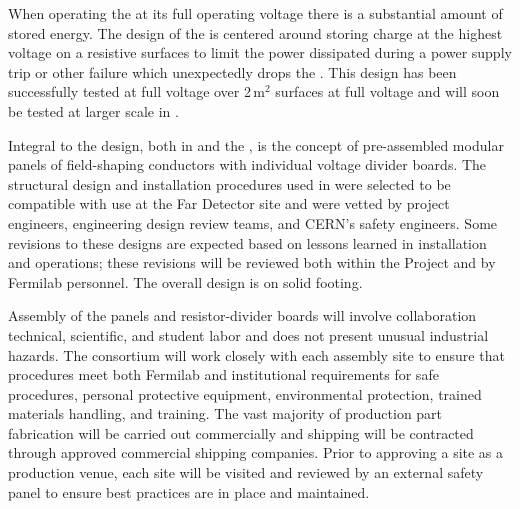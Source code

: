 When operating the  at its full operating voltage there is a substantial amount of stored energy. The design of the  is centered around storing charge  at the highest voltage on a resistive surfaces to limit the power dissipated during a power supply trip or other failure which unexpectedly drops the . This design has been successfully tested at full voltage over \num{2}\,m$^2$ surfaces at full voltage and will soon be tested at larger scale in .  

Integral to the   design, both in  and the , is the concept of pre-assembled modular panels of field-shaping conductors with individual voltage divider boards. The structural design and installation procedures used in  were selected to be compatible with use at the Far Detector site and were vetted by project engineers, engineering design review teams, and CERN's safety engineers. Some revisions to these designs are expected based on lessons learned in installation and operations; these revisions will be reviewed both within the Project and by Fermilab  personnel. The overall design is on solid footing. 

Assembly of the  panels and resistor-divider boards will involve collaboration technical, scientific, and student labor and  does not present unusual industrial hazards. The  consortium will work closely with each assembly site to ensure that procedures meet both Fermilab and institutional requirements for safe procedures, personal protective equipment, environmental protection, trained materials handling, and training. The vast majority of production part fabrication will be carried out commercially and shipping will be contracted through approved commercial shipping companies. Prior to approving a site as a production venue, each site will be visited and reviewed by an external safety panel to ensure best practices are in place and maintained. 

%

